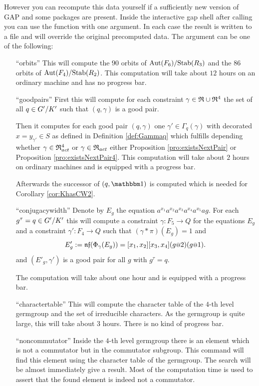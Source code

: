 \documentclass[a4paper,11pt]{amsart}
\begin{document}
However you can recompute this data yourself if a sufficiently new version of GAP and
some packages are present. Inside the interactive gap shell after calling 
you can use the function  with one argument. In each case
the result is written to a file and will override the original precomputed data. The 
argument can be one of the following:
\begin{itemize}
    \item [``orbits''] This will compute the $90$ orbits of ${\textup{Aut}(F_6)/\textup{Stab}(R_3)}$ and the
		       $86$ orbits of ${\textup{Aut}(F_4)/\textup{Stab}(R_2)}$. This computation will take
		       about $12$ hours on an ordinary machine and has no progress bar.
   \item [``goodpairs''] First this will compute for each constraint $\gamma\in\mathfrak{R}\cup\mathfrak{R}^4$ 
		      the set of all $q\in{G'/K'}$ such that $(q,\gamma)$ is a good pair.
		      
		      Then it computes for each good pair $(q,\gamma)$ one $\gamma'\in\Gamma_q(\gamma)$
		      with decorated $x=y_{\gamma'}\in S$ as defined in Definition \ref{def:Gammaq} which 
		      fulfills depending whether $\gamma\in\mathfrak{R}^4_{act}$ or $\gamma\in\mathfrak{R}_{act}$ 
		      either Proposition \ref{pro:existsNextPair} or Proposition \ref{pro:existsNextPair4}.
		      This computation will take about $2$ hours on ordinary machines and is equipped 
		      with a progress bar. 
		      
		      Afterwards the successor of $(q,\id)$ is computed which is needed for 
		      Corollary \ref{cor:KhasCW2}. 
   \item [``conjugacywidth''] Denote by $E_g$ the equation $a^{x_1}a^{x_2}a^{x_3}a^{x_4}a^{x_5}ag$.
		      For each $g^\tau=q\in{G'/K'}$ this will compute a constraint 
		      $\gamma\colon F_5 \to Q$ for the equations $E_g$
		      and a constraint $\gamma'\colon F_4\to Q$ such that
		      $(\gamma * \pi)(E_g) = 1$ and 
		      \[E'_g := \nf(\Phi_\gamma(E_g))=[x_1,x_2][x_3,x_4](g\at{2})(g\at{1}).\] and
		      $(E'_g,\gamma')$ is a good pair for all $g$ with $g^\tau=q$.
		      
		      The computation will take about one hour and is equipped with a progress bar.
   \item [``charactertable''] This will compute the character table of the $4$-th level germgroup
		      and the set of irreducible characters. 
		      As the germgroup is quite large, this
		      will take about $3$ hours. There is no kind of progress bar.
   \item [``noncommutator''] Inside the $4$-th level germgroup there is an element which is not
		      a commutator but in the commutator subgroup. This command will find this 
		      element using the character table of the germgroup. The search will be 
		      almost immediately give a result. Most of the computation time is used
		      to assert that the found element is indeed not a commutator.
		      

\end{itemize}
\end{document}
